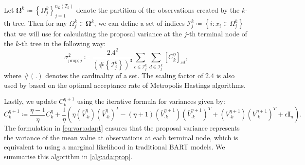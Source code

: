 \documentclass[
12pt]{article}
\begin{document}
	Let $\mathbf{\Omega}^{k}\coloneqq \left\{\Omega_j^{k}\right\}_{j=1}^{n_L(T_k)}$ denote the partition of the observations created by the $k$-th tree. Then for any $\Omega_{j}^{k}\in \mathbf{\Omega}^{k}$, we can define a set of indices $\mathcal{I}_{j}^{k}\coloneqq \left\{i:x_i\in \Omega_{j}^{k}\right\}$ that we will use for calculating the proposal variance at the $j$-th terminal node of the $k$-th tree in the following way:
	\begin{equation}\label{eq:var:adapt}
		\sigma_{\text{prop};j}^2 \coloneqq \frac{2.4^2}{\left(\#\left\{\mathcal{I}_{j}^{k}\right\}\right)^3}
		\sum_{c\in\mathcal{I}_{j}^{k}}\sum_{d\in\mathcal{I}_{j}^{k}}\left[C_k^{\eta}\right]_{cd},
	\end{equation}
	where $\#(.)$ denotes the cardinality of a set. The scaling factor of $2.4$ is also used by \citet{haario_AMH} based on the optimal acceptance rate of Metropolis Hastings algorithms.
	
	Lastly, we update $C_k^{\eta+1}$ using the iterative formula for variances given by:
	\begin{equation*}
		C_k^{\eta+1} \coloneqq 
		\frac{\eta-1}{\eta} C_k^{\eta} 
		+ \frac{1}{\eta}\left(\eta 
		\left(\overline{V}_{\cdot k}^{\eta}\right)\left(\overline{V}_{\cdot k}^{\eta}\right)^T 
		- (\eta+1)\left(\overline{V}_{\cdot k}^{\eta+1}\right)\left(\overline{V}_{\cdot k}^{\eta+1}\right)^T 
		+ \left({V}_{\cdot k}^{\eta+1}\right)\left({V}_{\cdot k}^{\eta+1}\right)^T + \epsilon\mathbf{I}_n\right).
	\end{equation*}
	The formulation in \cref{eq:var:adapt} ensures that the proposal variance represents the variance of the mean value at observations at each terminal node, which is equivalent to using a marginal likelihood in traditional BART models. We summarise this algorithm in \cref{alg:ada:prop}.
	
\end{document}
